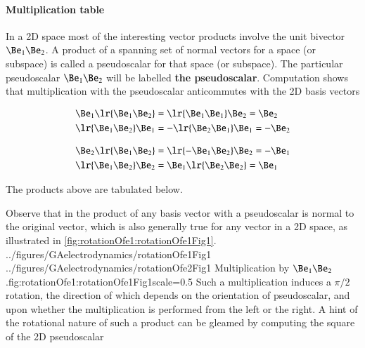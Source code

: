 
\paragraph{Multiplication table}

In a 2D space most of the interesting vector products involve the unit bivector \( \Be_1 \Be_2 \).  A product of a spanning set of normal vectors for a space (or subspace) is called a pseudoscalar for that space (or subspace).  The particular pseudoscalar \( \Be_1 \Be_2 \) will be labelled \textbf{the pseudoscalar}.  Computation shows that multiplication with the pseudoscalar anticommutes with the 2D basis vectors

\begin{dmath}\label{eqn:SimpleProducts2:180}
\begin{aligned}
   \Be_1 \lr{ \Be_1 \Be_2 } &= \lr{ \Be_1 \Be_1 } \Be_2 = \Be_2 \\
   \lr{ \Be_1 \Be_2 } \Be_1 &= -\lr{ \Be_2 \Be_1 } \Be_1 = -\Be_2 \\
\end{aligned}
\end{dmath}

\begin{dmath}\label{eqn:SimpleProducts2:200}
\begin{aligned}
   \Be_2 \lr{ \Be_1 \Be_2 } &= \lr{ -\Be_1 \Be_2 } \Be_2 = -\Be_1 \\
   \lr{ \Be_1 \Be_2 } \Be_2 &= \Be_1 \lr{ \Be_2 \Be_2 } = \Be_1 \\
\end{aligned}
\end{dmath}

The products above are tabulated below.

Observe that in  the product of any basis vector with a pseudoscalar is normal to the original vector, which is also generally true for any vector in a 2D space, as illustrated in \cref{fig:rotationOfe1:rotationOfe1Fig1}.
\imageTwoFigures
{../figures/GAelectrodynamics/rotationOfe1Fig1}
{../figures/GAelectrodynamics/rotationOfe2Fig1}
{Multiplication by \( \Be_1 \Be_2 \).}{fig:rotationOfe1:rotationOfe1Fig1}{scale=0.5}
Such a multiplication induces a \( \pi/2 \) rotation, the direction of which depends on the orientation of pseudoscalar, and upon whether the multiplication is performed from the left or the right.  A hint of the rotational nature of such a product can be gleamed by computing the square of the 2D pseudoscalar

